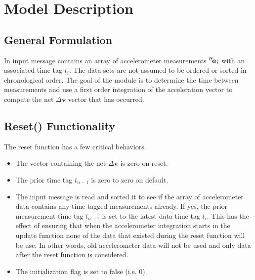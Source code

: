 



\section{Model Description}
\subsection{General Formulation}
In input message contains an array of accelerometer measurements $\leftexp{B}{\bm a_{i}}$ with an associated time tag $t_{i}$.  The data sets are not assumed to be ordered or sorted in chronological order.  The goal of the module is to determine the time between measurements and use a first order integration of the acceleration vector to compute the net $\Delta\bm v$ vector that has occurred.


\subsection{Reset() Functionality}
The reset function has a few critical behaviors.  
\begin{itemize}
	\item The vector containing the net $\Delta \bm v$ is zero on reset.
	\item The prior time tag $t_{n-1}$ is zero to zero on default.
	\item The input message is read and sorted it to see if the array of accelerometer data contains any time-tagged measurements already.  If yes, the prior measurement time tag $t_{n-1}$ is set to the latest data time tag $t_{i}$.  This has the effect of ensuring that when the accelerometer integration starts in the update function none of the data that existed during the reset function will be use.  In other words, old accelerometer data will not be used and only data after the reset function is considered.
	\item The initialization flag is set to false (i.e. 0).
\end{itemize}


